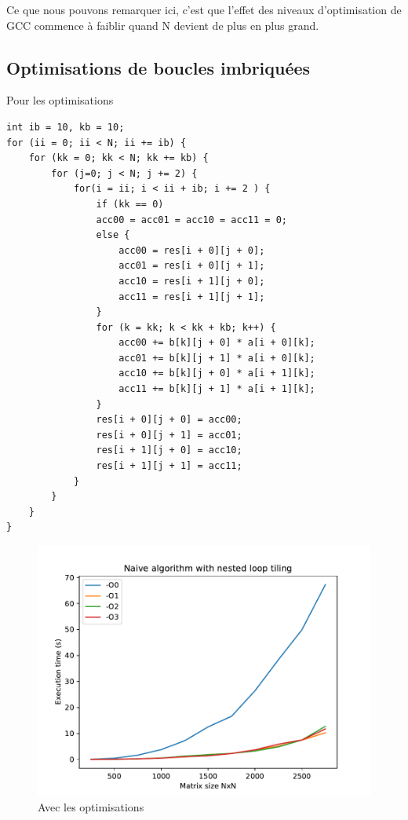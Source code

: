 \documentclass {article}
\begin{document}
Ce que nous pouvons remarquer ici, c'est que l'effet des niveaux d'optimisation de GCC commence à faiblir quand N devient de plus en plus grand.

\subsection{Optimisations de boucles imbriquées}
Pour les optimisations 
\begin{lstlisting}
int ib = 10, kb = 10;
for (ii = 0; ii < N; ii += ib) {
    for (kk = 0; kk < N; kk += kb) {
        for (j=0; j < N; j += 2) {
            for(i = ii; i < ii + ib; i += 2 ) {
                if (kk == 0)
                acc00 = acc01 = acc10 = acc11 = 0;
                else {
                    acc00 = res[i + 0][j + 0];
                    acc01 = res[i + 0][j + 1];
                    acc10 = res[i + 1][j + 0];
                    acc11 = res[i + 1][j + 1];
                }
                for (k = kk; k < kk + kb; k++) {
                    acc00 += b[k][j + 0] * a[i + 0][k];
                    acc01 += b[k][j + 1] * a[i + 0][k];
                    acc10 += b[k][j + 0] * a[i + 1][k];
                    acc11 += b[k][j + 1] * a[i + 1][k];
                }
                res[i + 0][j + 0] = acc00;
                res[i + 0][j + 1] = acc01;
                res[i + 1][j + 0] = acc10;
                res[i + 1][j + 1] = acc11;
            }
        }
    }
}
\end{lstlisting}

\begin{figure}[H]
    \includegraphics[width=\linewidth]{plot/with_opt.pdf}
    \caption{Avec les optimisations}
    \label{fig:with_opt}
\end{figure}
\end{document}

